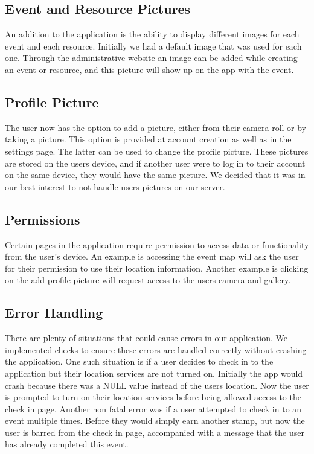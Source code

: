 \documentclass[onecolumn, draftclsnofoot,10pt, compsoc]{IEEEtran}
\begin{document}
  \subsection{Event and Resource Pictures}
  An addition to the application is the ability to display different images for each event and each resource. Initially we had a default image that was used for each one.
  Through the administrative website an image can be added while creating an event or resource, and this picture will show up on the app with the event.

  \subsection{Profile Picture}
  The user now has the option to add a picture, either from their camera roll or by taking a picture. This option is provided at account creation as well as in the settings
  page. The latter can be used to change the profile picture. These pictures are stored on the users device, and if another user were to log in to their account on the
  same device, they would have the same picture. We decided that it was in our best interest to not handle users pictures on our server.

  \subsection{Permissions}
  Certain pages in the application require permission to access data or functionality from the user's device. An example is accessing the event map will ask the user for their
  permission to use their location information. Another example is clicking on the add profile picture will request access to the users camera and gallery.

  \subsection{Error Handling}
  There are plenty of situations that could cause errors in our application. We implemented checks to ensure these errors are handled correctly without crashing
  the application. One such situation is if a user decides to check in to the application but their location services are not turned on. Initially the app would crash
  because there was a NULL value instead of the users location. Now the user is prompted to turn on their location services before being allowed access to the check
  in page. Another non fatal error was if a user attempted to check in to an event multiple times. Before they would simply earn another stamp, but now the user is
  barred from the check in page, accompanied with a message that the user has already completed this event.
\end{document}
